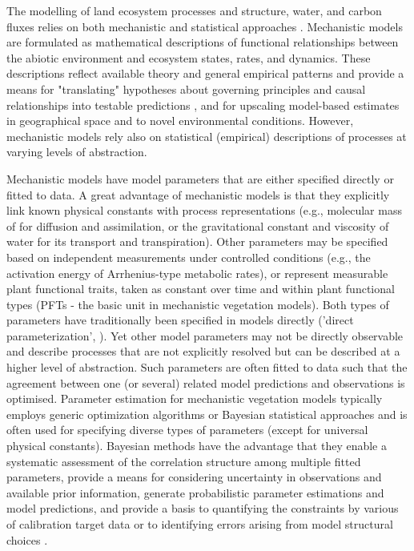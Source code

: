 \documentclass[gmd, manuscript]{copernicus}
\begin{document}


\introduction  %

The modelling of land ecosystem processes and structure, water, and carbon fluxes relies on both mechanistic and statistical approaches \citep{dietze2018, hartig2012, vanoijen2005}. Mechanistic models are formulated as mathematical descriptions of functional relationships between the abiotic environment and ecosystem states, rates, and dynamics. These descriptions reflect available theory and general empirical patterns and provide a means for "translating" hypotheses about governing principles and causal relationships into testable predictions \citep{marquet2014}, and for upscaling model-based estimates in geographical space and to novel environmental conditions. However, mechanistic models rely also on statistical (empirical) descriptions of processes at varying levels of abstraction.

Mechanistic models have model parameters that are either specified directly or fitted to data. A great advantage of mechanistic models is that they explicitly link known physical constants with process representations (e.g., molecular mass of  for diffusion and assimilation, or the gravitational constant and viscosity of water for its transport and transpiration). Other parameters may be specified based on independent measurements under controlled conditions (e.g., the activation energy of Arrhenius-type metabolic rates), or represent measurable plant functional traits, taken as constant over time and within plant functional types (PFTs - the basic unit in mechanistic vegetation models). Both types of parameters have traditionally been specified in models directly ('direct parameterization', \citep{hartig2012}). Yet other model parameters may not be directly observable and describe processes that are not explicitly resolved but can be described at a higher level of abstraction. Such parameters are often fitted to data such that the agreement between one (or several) related model predictions and observations is optimised. Parameter estimation for mechanistic vegetation models typically employs generic optimization algorithms or Bayesian statistical approaches and is often used for specifying diverse types of parameters (except for universal physical constants). Bayesian methods have the advantage that they enable a systematic assessment of the correlation structure among multiple fitted parameters, provide a means for considering uncertainty in observations and available prior information, generate probabilistic parameter estimations and model predictions, and provide a basis to quantifying the constraints by various of calibration target data or to identifying errors arising from model structural choices \citep{bagnara2015, dietze2018, hartig2012, vanoijen2013, raj2018, vanoijen2005, xiao2014}.
\end{document}
